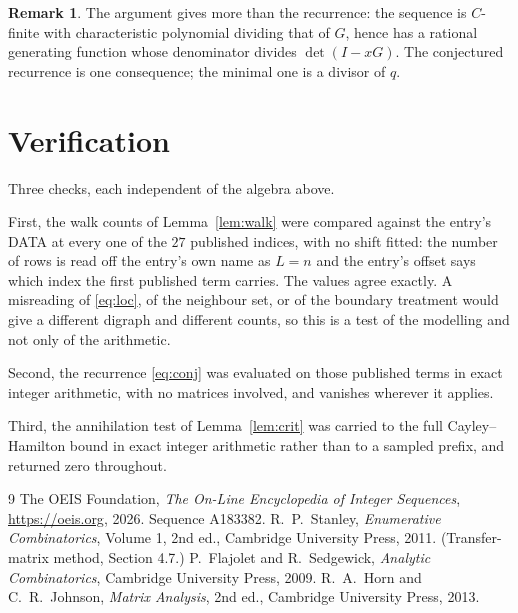\documentclass[11pt,a4paper]{article}
\theoremstyle{plain}
\theoremstyle{definition}
\newtheorem{remark}[theorem]{Remark}
\begin{document}
\begin{remark}
The argument gives more than the recurrence: the sequence is $C$-finite with characteristic
polynomial dividing that of $G$, hence has a rational generating function whose denominator
divides $\det(I-xG)$. The conjectured recurrence is one consequence; the minimal one is a
divisor of $q$.
\end{remark}

\section{Verification}

Three checks, each independent of the algebra above.

First, the walk counts of Lemma~\ref{lem:walk} were compared against the entry's DATA at
every one of the $27$ published indices, with no shift fitted: the number of rows is
read off the entry's own name as $L=n$ and the entry's offset says which index the first
published term carries. The values agree exactly. A misreading of \eqref{eq:loc}, of the
neighbour set, or of the boundary treatment would give a different digraph and different
counts, so this is a test of the modelling and not only of the arithmetic.

Second, the recurrence \eqref{eq:conj} was evaluated on those published terms in exact
integer arithmetic, with no matrices involved, and vanishes wherever it applies.

Third, the annihilation test of Lemma~\ref{lem:crit} was carried to the full
Cayley--Hamilton bound in exact integer arithmetic rather than to a sampled prefix, and
returned zero throughout.

\begin{thebibliography}{9}
 The OEIS Foundation, \emph{The On-Line Encyclopedia of Integer
Sequences}, \url{https://oeis.org}, 2026. Sequence A183382.
 R.~P.~Stanley, \emph{Enumerative Combinatorics}, Volume 1, 2nd ed.,
Cambridge University Press, 2011. (Transfer-matrix method, Section 4.7.)
 P.~Flajolet and R.~Sedgewick, \emph{Analytic Combinatorics}, Cambridge
University Press, 2009.
 R.~A.~Horn and C.~R.~Johnson, \emph{Matrix Analysis}, 2nd ed., Cambridge
University Press, 2013.
\end{thebibliography}
\end{document}
